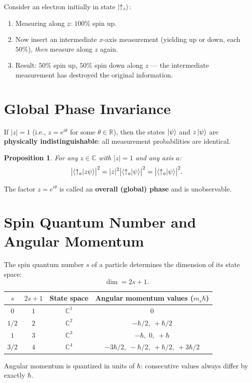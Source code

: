 \documentclass[11pt,a4paper]{article}
\theoremstyle{definition}
\theoremstyle{plain}
\newtheorem{proposition}{Proposition}[section]
\theoremstyle{remark}
\begin{document}
Consider an electron initially in state $\ket{\uparrow_z}$:
\begin{enumerate}
    \item Measuring along $z$: $100\%$ spin up.
    \item Now insert an intermediate $x$-axis measurement (yielding up or down, each $50\%$), \emph{then} measure along $z$ again.
    \item Result: $50\%$ spin up, $50\%$ spin down along $z$ --- the intermediate measurement has destroyed the original information.
\end{enumerate}

\section{Global Phase Invariance}

If $|z| = 1$ (i.e., $z = e^{i\theta}$ for some $\theta \in \mathbb{R}$), then the states $\ket{\psi}$ and $z\ket{\psi}$ are \textbf{physically indistinguishable}: all measurement probabilities are identical.

\begin{proposition}
    For any $z \in \mathbb{C}$ with $|z| = 1$ and any axis $a$:
    \[
        \bigl|\braket{\uparrow_a}{z\psi}\bigr|^2 = |z|^2 \bigl|\braket{\uparrow_a}{\psi}\bigr|^2 = \bigl|\braket{\uparrow_a}{\psi}\bigr|^2.
    \]
\end{proposition}

The factor $z = e^{i\theta}$ is called an \textbf{overall (global) phase} and is unobservable.

\section{Spin Quantum Number and Angular Momentum}

The spin quantum number $s$ of a particle determines the dimension of its state space:
\[
    \dim = 2s + 1.
\]

\begin{center}
\renewcommand{\arraystretch}{1.3}
\begin{tabular}{c|c|c|c}
    $s$ & $2s+1$ & State space & Angular momentum values ($m_s \hbar$) \\ \hline
    $0$ & $1$ & $\mathbb{C}^1$ & $0$ \\
    $1/2$ & $2$ & $\mathbb{C}^2$ & $-\hbar/2,\; +\hbar/2$ \\
    $1$ & $3$ & $\mathbb{C}^3$ & $-\hbar,\; 0,\; +\hbar$ \\
    $3/2$ & $4$ & $\mathbb{C}^4$ & $-3\hbar/2,\; -\hbar/2,\; +\hbar/2,\; +3\hbar/2$
\end{tabular}
\end{center}

Angular momentum is quantized in units of $\hbar$: consecutive values always differ by exactly $\hbar$.
\end{document}
